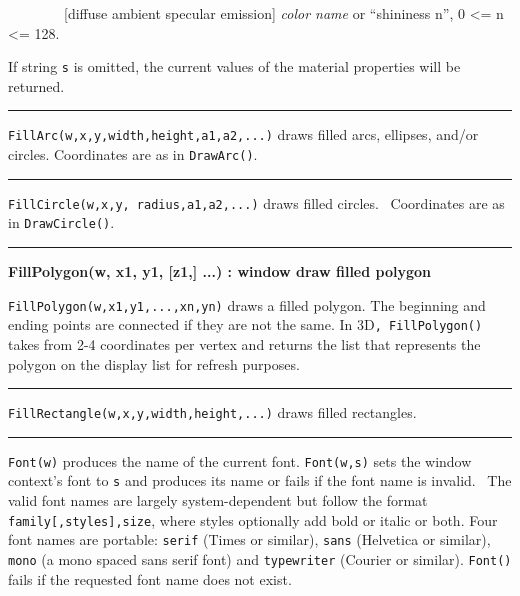 \ \ \ \ \ \ \ \ [diffuse {\textbar} ambient {\textbar} specular
{\textbar} emission] \textit{color name} or
{\textquotedblleft}shininess n{\textquotedblright}, 0 {\textless}= n
{\textless}= 128.

If string \texttt{s} is omitted, the current values of the material
properties will be returned.

\bigskip\hrule\vspace{0.1cm}

\noindent
\texttt{FillArc(w,x,y,width,height,a1,a2,...)} draws filled arcs,
ellipses, and/or circles. Coordinates are as in \texttt{DrawArc()}.

\bigskip\hrule\vspace{0.1cm}

\noindent
\texttt{FillCircle(w,x,y, radius,a1,a2,...)} draws filled circles.
\ Coordinates are as in \texttt{DrawCircle()}.

\bigskip\hrule\vspace{0.1cm}
\noindent
{\bf FillPolygon(w, x1, y1, [z1,] ...) : window \hfill draw filled polygon}

\noindent
\texttt{FillPolygon(w,x1,y1,...,xn,yn)} draws a filled polygon. The
beginning and ending points are connected if they are not the same. In
3D\texttt{, FillPolygon()} takes from 2-4 coordinates per vertex and
returns the list that represents the polygon on the display list for
refresh purposes. 

\bigskip\hrule\vspace{0.1cm}

\noindent
\texttt{FillRectangle(w,x,y,width,height,...)} draws filled rectangles.

\bigskip\hrule\vspace{0.1cm}

\noindent
\texttt{Font(w)} produces the name of the current font.
\texttt{Font(w,s)} sets the window context's font to
\texttt{s} and produces its name or fails if the font name is invalid.
\ The valid font names are largely system-dependent but follow the
format \texttt{family[,styles],size}, where styles optionally add bold
or italic or both. Four font names are portable: \texttt{serif} (Times
or similar), \texttt{sans} (Helvetica or similar), \texttt{mono} (a
mono spaced sans serif font) and \texttt{typewriter} (Courier or
similar). \texttt{Font()} fails if the requested font name does not
exist.

